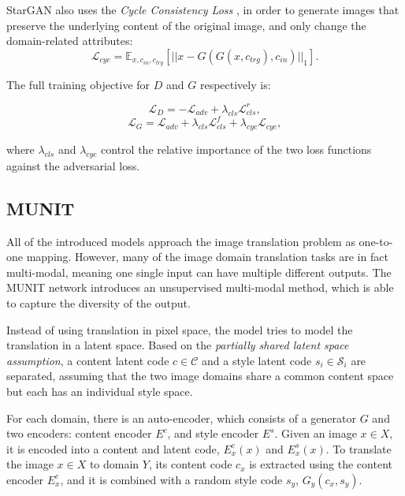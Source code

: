 \documentclass{article}
\begin{document}
StarGAN \cite{choi_stargan:_2017} also uses the \textit{Cycle Consistency Loss} \cite{zhu_unpaired_2017}, in order to generate images that preserve the underlying content of the original image, and only change the domain-related attributes:
\begin{equation}
\mathcal{L}_{cyc} = \mathbb{E}_{x,c_{in},c_{trg}}[||x - G(G(x,c_{trg}), c_{in})||_{1}].
\label{eq:stargan_cyc}
\end{equation}


The full training objective for $D$ and $G$ respectively is:

\begin{equation}
\mathcal{L}_{D} = -\mathcal{L}_{adv} + \lambda_{cls} \mathcal{L}^{r}_{cls},
\label{eq:stargan_D}
\end{equation}
\begin{equation}
\mathcal{L}_{G} = \mathcal{L}_{adv} + \lambda_{cls} \mathcal{L}^{f}_{cls} + \lambda_{cyc} \mathcal{L}_{cyc},
\label{eq:stargan_G}
\end{equation}

where $\lambda_{cls}$ and $\lambda_{cyc}$ control the relative importance of the two loss functions against the adversarial loss.

\subsection{MUNIT}
All of the introduced models approach the image translation problem as one-to-one mapping. However, many of the image domain translation tasks are in fact multi-modal, meaning one single input can have multiple different outputs. The MUNIT network \cite{huang_multimodal_2018} introduces an unsupervised multi-modal method, which is able to capture the diversity of the output.

Instead of using translation in pixel space, the model tries to model the translation in a latent space. Based on the \textit{partially shared latent space assumption}, a content latent code $c \in \mathcal{C}$ and a style latent code $s_{i} \in \mathcal{S}_{i}$ are separated, assuming that the two image domains share a common content space but each has an individual style space. 

For each domain, there is an auto-encoder, which consists of a generator $G$ and two encoders: content encoder $E^c$, and style encoder $E^s$. Given an image $x \in X$, it is encoded into a content and latent code, $E^c_x(x)$ and $E^s_x(x)$. To translate the image $x \in X$ to domain $Y$, its content code $c_{x}$ is extracted using the content encoder $E^c_x$, and it is combined with a random style code $s_{y}$, $G_y(c_x, s_y)$.
\end{document}
